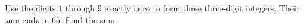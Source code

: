 Use the digits $1$ through $9$ exactly once to form three three-digit integers. Their sum ends in $65$. Find the sum.
